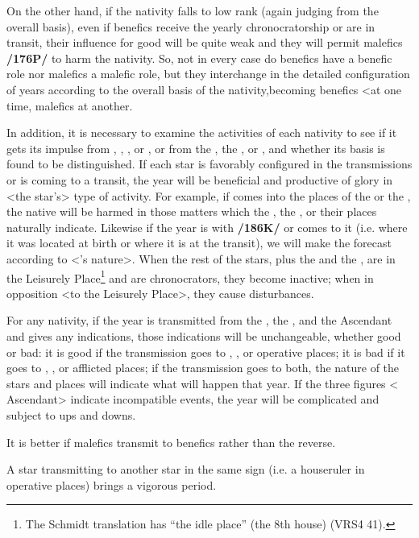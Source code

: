  
On the other hand, if the nativity falls to low rank (again judging from the overall basis), even if benefics receive the yearly chronocratorship or are in transit, their influence for good will be quite weak and they will permit malefics \textbf{/176P/} to harm the nativity. \mnbm So, not in every case do benefics have a benefic role nor  malefics a malefic role, but they \mnmb interchange in the detailed configuration of years according to the overall basis of the nativity,becoming benefics <at one time, malefics at another.

In addition, it is necessary to examine the activities of each nativity to see if it gets its impulse from \Mercury, \Mars, \Venus, or \Saturn, or from the \Sun, the \Moon, or \Jupiter, and whether its basis is found to be distinguished. If each star is favorably configured in the transmissions or is coming to a transit, the year will be beneficial and productive of glory in <the star’s> type of activity. For example, if \Saturn\xspace comes into the places of the \Sun\xspace or the \Moon, the native will be harmed in those matters which the \Sun, the \Moon, or their places naturally indicate. Likewise if the year is with \Saturn\xspace \textbf{/186K/} or comes to it (i.e. where it was located at birth or where it is at the transit), we will make the forecast according to <\Saturn’s nature>. When the rest of the stars, plus the \Sun\xspace and the \Moon, are in the Leisurely Place\footnote{The Schmidt translation has ``the idle place'' (the 8th house) (VRS4 41).} and are chronocrators, they become inactive; when in opposition <to the Leisurely Place>, they cause disturbances.

For any nativity, if the year is transmitted from the \Sun, the \Moon, and the Ascendant and gives any indications, those indications will be unchangeable, whether good or bad: it is good if the transmission goes to \Venus, \Jupiter, or operative places; it is bad if it goes to \Saturn, \Mars, or afflicted places; if the transmission goes to both, the nature of the stars and places will indicate what will happen that year. If the three figures <\Sun\xspace \Moon\xspace Ascendant> indicate incompatible events, the year will be complicated and
subject to ups and downs. 

It is better if malefics transmit to benefics rather than the reverse. 

A star transmitting to another star in the same sign (i.e. a houseruler in operative places) brings a vigorous period.

